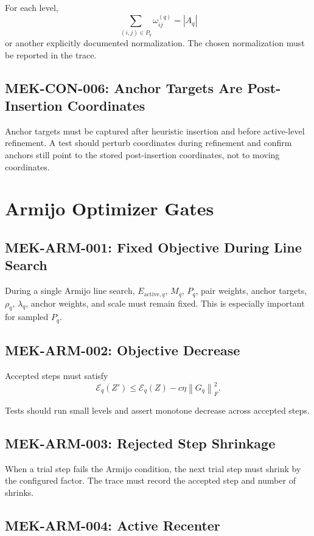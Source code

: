 \documentclass[11pt]{article}
\newcommand{\norm}[1]{\left\lVert #1 \right\rVert}
\begin{document}
For each level,
\[
  \sum_{(i,j)\in P_q}\omega_{ij}^{(q)} = |A_q|
\]
or another explicitly documented normalization. The chosen normalization must
be reported in the trace.

\subsection{MEK-CON-006: Anchor Targets Are Post-Insertion Coordinates}

Anchor targets must be captured after heuristic insertion and before
active-level refinement. A test should perturb coordinates during refinement
and confirm anchors still point to the stored post-insertion coordinates, not
to moving coordinates.

\section{Armijo Optimizer Gates}

\subsection{MEK-ARM-001: Fixed Objective During Line Search}

During a single Armijo line search, \(E_{\mathrm{active},q}\), \(M_q\), \(P_q\),
pair weights, anchor targets, \(\rho_q\), \(\lambda_q\), anchor weights, and
scale must remain fixed. This is especially important for sampled \(P_q\).

\subsection{MEK-ARM-002: Objective Decrease}

Accepted steps must satisfy
\[
  \mathcal{E}_q(Z')
  \le
  \mathcal{E}_q(Z)
  -
  c\eta\norm{G_q}_F^2.
\]

Tests should run small levels and assert monotone decrease across accepted
steps.

\subsection{MEK-ARM-003: Rejected Step Shrinkage}

When a trial step fails the Armijo condition, the next trial step must shrink
by the configured factor. The trace must record the accepted step and number of
shrinks.

\subsection{MEK-ARM-004: Active Recenter}
\end{document}

